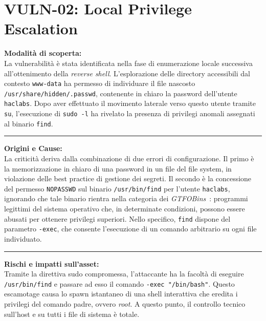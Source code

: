 \documentclass[11pt]{report}
\begin{document}
	\section{VULN-02: Local Privilege Escalation}
	\begin{tcolorbox}[colback=gray!5, colframe=headerblue, arc=3pt, boxrule=0.8pt, breakable]
		\textbf{Modalità di scoperta:}\\
		La vulnerabilità è stata identificata nella fase di enumerazione locale successiva all'ottenimento della \textit{reverse shell}. L'esplorazione delle directory accessibili dal contesto \texttt{www-data} ha permesso di individuare il file nascosto \texttt{/usr/share/hidden/.passwd}, contenente in chiaro la password dell'utente \texttt{haclabs}. Dopo aver effettuato il movimento laterale verso questo utente tramite \texttt{su}, l'esecuzione di \texttt{sudo -l} ha rivelato la presenza di privilegi anomali assegnati al binario \texttt{find}.
		
		\vspace{0.2cm}\hrule\vspace{0.2cm}
		
		\textbf{Origini e Cause:}\\
		La criticità deriva dalla combinazione di due errori di configurazione. Il primo è la memorizzazione in chiaro di una password in un file del file system, in violazione delle best practice di gestione dei segreti. Il secondo è la concessione del permesso \texttt{NOPASSWD} sul binario \texttt{/usr/bin/find} per l'utente \texttt{haclabs}, ignorando che tale binario rientra nella categoria dei \textit{GTFOBins}~\cite{gtfobins}: programmi legittimi del sistema operativo che, in determinate condizioni, possono essere abusati per ottenere privilegi superiori. Nello specifico, \texttt{find} dispone del parametro \texttt{-exec}, che consente l'esecuzione di un comando arbitrario su ogni file individuato.
		
		\vspace{0.2cm}\hrule\vspace{0.2cm}
		
		\textbf{Rischi e impatti sull'asset:}\\
		Tramite la direttiva sudo compromessa, l'attaccante ha la facoltà di eseguire \texttt{/usr/bin/find} e passare ad esso il comando \texttt{-exec "/bin/bash"}. Questo escamotage causa lo spawn istantaneo di una shell interattiva che eredita i privilegi del comando padre, ovvero \textit{root}. A questo punto, il controllo tecnico sull'host e su tutti i file di sistema è totale.
		

\end{tcolorbox}
\end{document}
